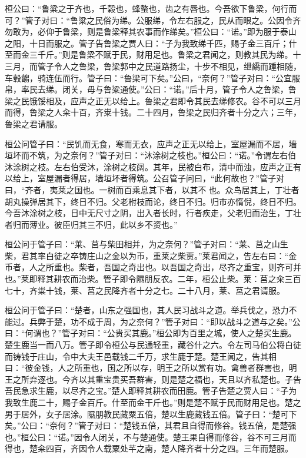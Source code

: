\documentclass[]{article}
\begin{document}
桓公曰：``鲁粱之于齐也，千榖也，蜂螫也，齿之有唇也。今吾欲下鲁梁，何行而可？''管子对曰：``鲁粱之民俗为绨。公服绨，令左右服之，民从而眼之。公因令齐勿敢为，必仰于鲁梁，则是鲁梁释其农事而作绨矣。''桓公曰：``诺。''即为服于泰山之阳，十日而服之。管子告鲁梁之贾人曰：``子为我致绨千匹，赐子金三百斤；什至而金三千斤。''则是鲁梁不赋于民，财用足也。鲁梁之君闻之，则教其民为绨。十三月，而管子令人之鲁梁，鲁梁郭中之民道路扬尘，十步不相见，绁繑而踵相随，车毂齺，骑连伍而行。管子曰：``鲁梁可下矣。''公曰，``奈何？''管子对曰：``公宜服帛，率民去绨。闭关，毋与鲁粱通使。''公曰：``诺。''后十月，管子令人之鲁梁，鲁梁之民饿馁相及，应声之正无以给上。鲁梁之君即令其民去绨修农。谷不可以三月而得，鲁梁之人籴十百，齐粜十钱。二十四月，鲁梁之民归齐者十分之六；三年，鲁梁之君请服。

桓公问管子曰：``民饥而无食，寒而无衣，应声之正无以给上，室屋漏而不居，墙垣坏而不筑，为之奈何？''管子对曰：``沐涂树之枝也。''桓公曰：``诺。''令谓左右伯沐涂树之枝。左右伯受沐，涂树之枝阔。其年，民被白布，清中而浊，应声之正有以给上，室屋漏者得居，墙垣坏者得筑。公召管子问曰，``此何故也？''管子对曰，``齐者，夷莱之国也。一树而百乘息其下者，以其不也。众鸟居其上，丁壮者胡丸操弹居其下，终日不归。父老柎枝而论，终日不归。归市亦惰倪，终日不归。今吾沐涂树之枝，日中无尺寸之阴，出入者长时，行者疾走，父老归而治生，丁壮者归而薄业。彼臣归其三不归，此以乡不资也。''

桓公问于管子曰：``莱、莒与柴田相并，为之奈何？''管子对曰：``莱、莒之山生柴，君其率白徒之卒铸庄山之金以为币，重莱之柴贾。''莱君闻之，告左右曰：``金币者，人之所重也。柴者，吾国之奇出也。以吾国之奇出，尽齐之重宝，则齐可并也。''莱即释其耕农而治柴。管子即令隰朋反农。二年，桓公止柴。莱：莒之籴三百七十，齐粜十钱，莱、莒之民降齐者十分之七。二十八月，莱、莒之君请服。

桓公问于管子曰：``楚者，山东之强国也，其人民习战斗之道。举兵伐之，恐力不能过。兵弊于楚，功不成于周，为之奈何？''管子对曰：``即以战斗之道与之矣。''公曰：``何谓也？''管子对曰：``公贵买其鹿。''桓公即为百里之城，使人之楚买生鹿。楚生鹿当一而八万。管子即令桓公与民通轻重，藏谷什之六。令左司马伯公将白徒而铸钱于庄山，令中大夫王邑载钱二千万，求生鹿于楚。楚王闻之，告其相曰：``彼金钱，人之所重也，国之所以存，明王之所以赏有功。禽兽者群害也，明王之所弃逐也。今齐以其重宝贵买吾群害，则是楚之福也，天且以齐私楚也。子告吾民急求生鹿，以尽齐之宝。''楚人即释其耕农而田鹿。管子告楚之贾人曰：``子为我致生鹿二十，赐子金百斤。什至而金干斤也。''则是楚不赋于民而财用足也。楚之男于居外，女子居涂。隰朋教民藏粟五倍，楚以生鹿藏钱五倍。管子曰：``楚可下矣。''公曰：``奈何？''管子对曰：``楚钱五倍，其君且自得而修谷。钱五倍，是楚强也。''桓公曰：``诺。''因令人闭关，不与楚通使。楚王果自得而修谷，谷不可三月而得也，楚籴四百，齐因令人载粟处芊之南，楚人降齐者十分之四。三年而楚服。
\end{document}
